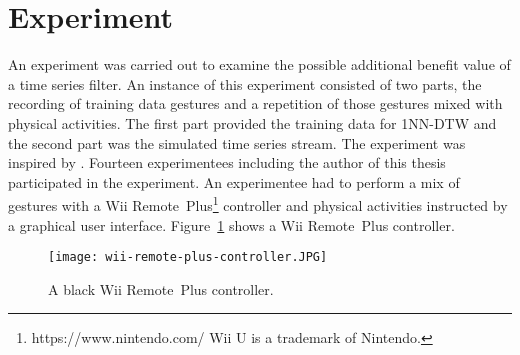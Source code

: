 \section{Experiment} \label{experiment}
An experiment was carried out to examine the possible additional benefit value of a time series filter. An instance of
this experiment consisted of two parts, the recording of training data gestures and a repetition of those gestures mixed
with physical activities. The first part provided the training data for 1NN-DTW and the second part was the simulated
time series stream. The experiment was inspired by \cite{liu2009uwave}. Fourteen experimentees including the author of
this thesis participated in the experiment. An experimentee had to perform a mix of gestures with a Wii
Remote\texttrademark~Plus\footnote{https://www.nintendo.com/ Wii U is a trademark of Nintendo.} controller and physical
activities instructed by a graphical user interface. Figure~\ref{fig:wii-remote} shows a Wii Remote\texttrademark~Plus
controller.
\begin{figure}
    \begin{center}
        \texttt{[image: wii-remote-plus-controller.JPG]}
    \end{center}
    \caption{A black Wii Remote\texttrademark~Plus controller.}
    \label{fig:wii-remote}
\end{figure}





